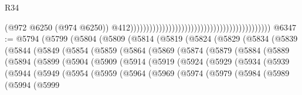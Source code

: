 \begin{lexlean}{R34}
\begin{coremodule}
                                                                                            (@972
                                                                                              @6250
                                                                                              (@974
                                                                                                @6250))
                                                                                            @412))))))))))))))))))))))))))))))))))))))))))))
@6347 := @5794
    (@5799
      (@5804
        (@5809
          (@5814
            (@5819
              (@5824
                (@5829
                  (@5834
                    (@5839
                      (@5844
                        (@5849
                          (@5854
                            (@5859
                              (@5864
                                (@5869
                                  (@5874
                                    (@5879
                                      (@5884
                                        (@5889
                                          (@5894
                                            (@5899
                                              (@5904
                                                (@5909
                                                  (@5914
                                                    (@5919
                                                      (@5924
                                                        (@5929
                                                          (@5934
                                                            (@5939
                                                              (@5944
                                                                (@5949
                                                                  (@5954
                                                                    (@5959
                                                                      (@5964
                                                                        (@5969
                                                                          (@5974
                                                                            (@5979
                                                                              (@5984
                                                                                (@5989
                                                                                  (@5994
                                                                                    (@5999

\end{coremodule}
\end{lexlean}
